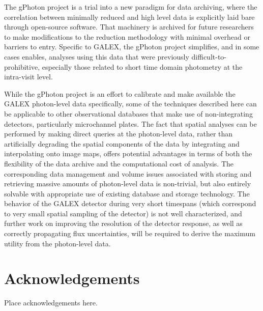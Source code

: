\documentclass[5p]{elsarticle}
\begin{document}
The gPhoton project is a trial into a new paradigm for data archiving, where the correlation between minimally reduced and high level data is explicitly laid bare through open-source software.  That machinery is archived for future researchers to make modifications to the reduction methodology with minimal overhead or barriers to entry.  Specific to GALEX, the gPhoton project simplifies, and in some cases enables, analyses using this data that were previously difficult-to-prohibitive, especially those related to short time domain photometry at the intra-visit level.

While the gPhoton project is an effort to calibrate and make available the GALEX photon-level data specifically, some of the techniques described here can be applicable to other observational databases that make use of non-integrating detectors, particularly microchannel plates. The fact that spatial analyses can be performed by making direct queries at the photon-level data, rather than artificially degrading the spatial components of the data by integrating and interpolating onto image maps, offers potential advantages in terms of both the flexibility of the data archive and the computational cost of analysis. The corresponding data management and volume issues associated with storing and retrieving massive amounts of photon-level data is non-trivial, but also entirely solvable with appropriate use of existing database and storage technology. The behavior of the GALEX detector during very short timespans (which correspond to very small spatial sampling of the detector) is not well characterized, and further work on improving the resolution of the detector response, as well as correctly propagating flux uncertainties, will be required to derive the maximum utility from the photon-level data.

\section{Acknowledgements}
Place acknowledgements here.




\clearpage



\clearpage

\end{document}
